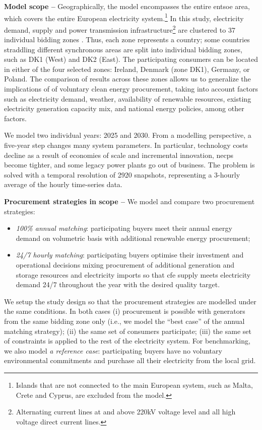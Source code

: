 \textbf{Model scope --} Geographically, the model encompasses the entire \gls{entsoe} area, which covers the entire European electricity system.\footnote{Islands that are not connected to the main European system, such as Malta, Crete and Cyprus, are excluded from the model.}
In this study, electricity demand, supply and power transmission infrastructure\footnote{Alternating current lines at and above 220kV voltage level and all high voltage direct current lines.} are clustered to 37 individual bidding zones \cite{PyPSAEur-docs-spatialresolution}. 
Thus, each zone represents a country; some countries straddling different synchronous areas are split into individual bidding zones, such as DK1 (West) and DK2 (East).
The participating consumers can be located in either of the four selected zones: Ireland, Denmark (zone DK1), Germany, or Poland.
The comparison of results across these zones allows us to generalize the implications of of voluntary clean energy procurement, taking into account factors such as electricity demand, weather, availability of renewable resources, existing electricity generation capacity mix, and national energy policies, among other factors.

We model two individual years: 2025 and 2030. 
From a modelling perspective, a five-year step changes many system parameters.
In particular, technology costs decline as a result of economies of scale and incremental innovation, \gls{necp}s become tighter, and some legacy power plants go out of business.
The problem is solved with a temporal resolution of 2920 snapshots, representing a 3-hourly average of the hourly time-series data.

\textbf{Procurement strategies in scope --} We model and compare two procurement strategies: 

\begin{itemize}[-]
    \item \textit{100\% annual matching}: participating buyers meet their annual energy demand on volumetric basis with additional renewable energy procurement;
    \item \textit{24/7 hourly matching}: participating buyers optimise their investment and operational decisions mixing procurement of additional generation and storage resources and electricity imports so that \gls{cfe} supply meets electricity demand 24/7 throughout the year with the desired quality target.
\end{itemize}

We setup the study design so that the procurement strategies are modelled under the same conditions.
In both cases (i) procurement is possible with generators from the same bidding zone only (i.e., we model the \enquote{best case} of the annual matching strategy); (ii) the same set of consumers participate; (iii) the same set of constraints is applied to the rest of the electricity system. 
For benchmarking, we also model \textit{a reference case}: participating buyers have no voluntary environmental commitments and purchase all their electricity from the local grid.

